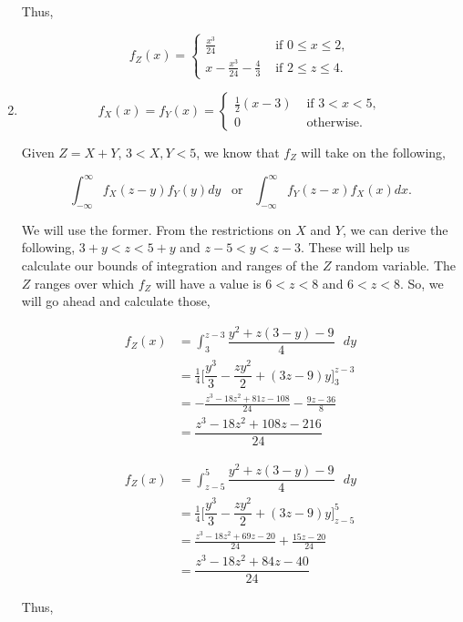 \documentclass[12pt]{article}
\begin{document}
\begin{enumerate}[label=(\alph*)]
\noindent
Thus, 

\[ f_Z(x) = \begin{cases} 
      \frac{x^3}{24} & \text{ if } 0 \leq x \leq 2, \\
      x - \frac{x^3}{24} - \frac{4}{3} & \text{ if } 2 \leq z \leq 4.
      \end{cases} \]

\item 
\[ f_X(x) = f_Y(x) = \begin{cases} 
     \frac{1}{2}(x-3) & \text{ if } 3 < x < 5, \\
      0 & \text{ otherwise}.
      \end{cases} \]

Given $Z = X + Y$, $3 < X, Y < 5$, we know that $f_Z$ will take on the following,

\begin{equation*}
\int_{- \infty}^{\infty} f_X(z-y) f_Y(y) dy \enspace \text{ or } \enspace \int_{- \infty}^{\infty} f_Y(z-x) f_X(x) dx.
\end{equation*}

\noindent
We will use the former. From the restrictions on $X$ and $Y$, we can derive the following, $3 + y < z < 5+y$ and $z-5 < y < z-3$. These will help us calculate our bounds of integration and ranges of the $Z$ random variable. The $Z$ ranges over which $f_Z$ will have a value is $6 < z < 8$ and $6 < z < 8$. So, we will go ahead and calculate those,

\begin{align*}
f_Z(x) &= \int_{3}^{z-3} \dfrac{y^2+z\left(3-y\right)-9}{4} \text{ } dy \\
&= \frac{1}{4} \Bigg [ \dfrac{y^3}{3}-\dfrac{zy^2}{2}+\left(3z - 9 \right)y \Bigg ]_{3}^{z-3} \\
&= - \frac{z^3-18z^2+81z-108}{24}-\frac{9z-36}{8} \\
&= \dfrac{z^3-18z^2+108z-216}{24}
\end{align*}

\begin{align*}
f_Z(x) &= \int_{z-5}^{5} \dfrac{y^2+z\left(3-y\right)-9}{4} \text{ } dy \\
&= \frac{1}{4} \Bigg [ \dfrac{y^3}{3}-\dfrac{zy^2}{2}+\left(3z - 9 \right)y \Bigg ]_{z-5}^{5} \\
&= \frac{z^3-18z^2+69z-20}{24}+\frac{15z-20}{24} \\
&= \dfrac{z^3-18z^2+84z-40}{24}
\end{align*}

\noindent
Thus, 


\end{enumerate}
\end{document}
